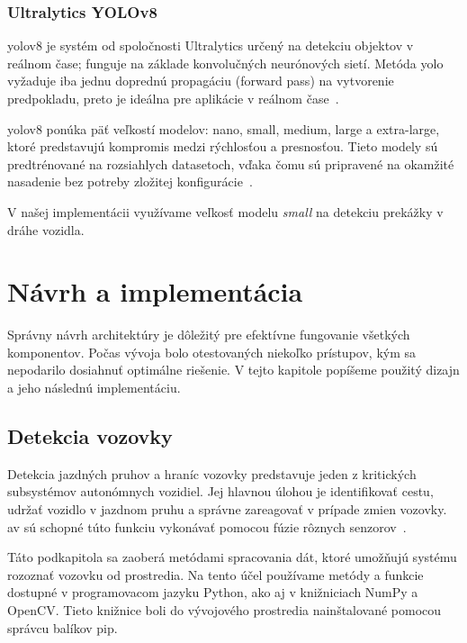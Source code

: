 \subsubsection{Ultralytics YOLOv8}\label{subsubsec:yolo}
\acrshort{yolo}v8 je systém od spoločnosti Ultralytics určený na detekciu objektov v reálnom čase; funguje na základe konvolučných neurónových sietí. Metóda \acrfull{yolo} vyžaduje iba jednu doprednú propagáciu (forward pass) na vytvorenie predpokladu, preto je ideálna pre aplikácie v reálnom čase~\cite{make2023}\cite{yolo2023}.\par
\acrshort{yolo}v8 ponúka päť veľkostí modelov: nano, small, medium, large a extra-large, ktoré predstavujú kompromis medzi rýchlosťou a presnosťou. Tieto modely sú predtrénované na rozsiahlych datasetoch, vďaka čomu sú pripravené na okamžité nasadenie bez potreby zložitej konfigurácie~\cite{yolo2023}.\par
V našej implementácii využívame veľkosť modelu \textit{small} na detekciu prekážky v dráhe vozidla.

\section{Návrh a implementácia}\label{sec:NavrhAImplementacia}
Správny návrh architektúry je dôležitý pre efektívne fungovanie všetkých komponentov. Počas vývoja bolo otestovaných niekoľko prístupov, kým sa nepodarilo dosiahnuť optimálne riešenie. V tejto kapitole popíšeme použitý dizajn a jeho následnú implementáciu.
\subsection{Detekcia vozovky}
Detekcia jazdných pruhov a hraníc vozovky predstavuje jeden z kritických subsystémov autonómnych vozidiel. Jej hlavnou úlohou je identifikovať cestu, udržať vozidlo v jazdnom pruhu a správne zareagovať v prípade zmien vozovky. \acrshort{av} sú schopné túto funkciu vykonávať pomocou fúzie rôznych senzorov~\cite{badue2021}.\par
Táto podkapitola sa zaoberá metódami spracovania dát, ktoré umožňujú systému rozoznať vozovku od prostredia. Na tento účel používame metódy a funkcie dostupné v programovacom jazyku Python, ako aj v knižniciach NumPy a OpenCV. Tieto knižnice boli do vývojového prostredia nainštalované pomocou správcu balíkov pip.
